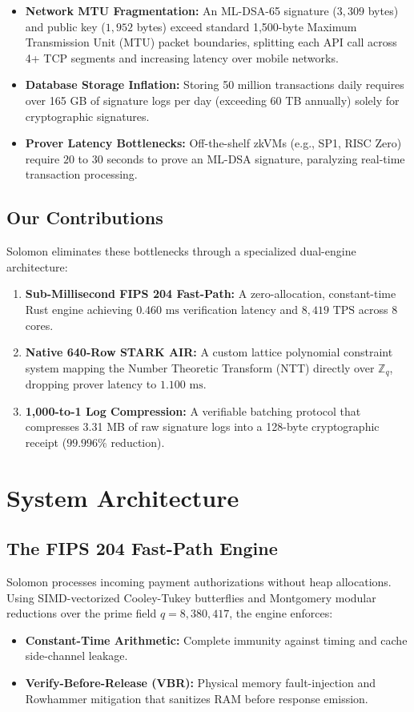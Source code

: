 \documentclass[runningheads]{llncs}
\begin{document}
\begin{itemize}
    \item \textbf{Network MTU Fragmentation:} An ML-DSA-65 signature ($3,309$ bytes) and public key ($1,952$ bytes) exceed standard 1,500-byte Maximum Transmission Unit (MTU) packet boundaries, splitting each API call across 4+ TCP segments and increasing latency over mobile networks.
    \item \textbf{Database Storage Inflation:} Storing 50 million transactions daily requires over 165 GB of signature logs per day (exceeding 60 TB annually) solely for cryptographic signatures.
    \item \textbf{Prover Latency Bottlenecks:} Off-the-shelf zkVMs (e.g., SP1, RISC Zero) require $20$ to $30$ seconds to prove an ML-DSA signature, paralyzing real-time transaction processing.
\end{itemize}

\subsection{Our Contributions}
Solomon eliminates these bottlenecks through a specialized dual-engine architecture:
\begin{enumerate}
    \item \textbf{Sub-Millisecond FIPS 204 Fast-Path:} A zero-allocation, constant-time Rust engine achieving $0.460\text{ ms}$ verification latency and $8,419\text{ TPS}$ across 8 cores.
    \item \textbf{Native 640-Row STARK AIR:} A custom lattice polynomial constraint system mapping the Number Theoretic Transform (NTT) directly over $\mathbb{Z}_q$, dropping prover latency to $1.100\text{ ms}$.
    \item \textbf{1,000-to-1 Log Compression:} A verifiable batching protocol that compresses 3.31 MB of raw signature logs into a 128-byte cryptographic receipt ($99.996\%$ reduction).
\end{enumerate}

\section{System Architecture}

\subsection{The FIPS 204 Fast-Path Engine}
Solomon processes incoming payment authorizations without heap allocations. Using SIMD-vectorized Cooley-Tukey butterflies and Montgomery modular reductions over the prime field $q = 8,380,417$, the engine enforces:
\begin{itemize}
    \item \textbf{Constant-Time Arithmetic:} Complete immunity against timing and cache side-channel leakage.
    \item \textbf{Verify-Before-Release (VBR):} Physical memory fault-injection and Rowhammer mitigation that sanitizes RAM before response emission.
\end{itemize}
\end{document}
